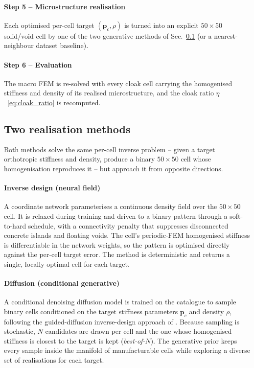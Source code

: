 \documentclass[preprint,12pt]{elsarticle}
\newcommand{\mbf}[1]{\mathbf{#1}}
\begin{document}
\paragraph{Step 5 -- Microstructure realisation} Each optimised per-cell target $(\mbf{p}_c,\rho)$ is turned into an explicit $50\times50$ solid/void cell by one of the two generative methods of Sec.~\ref{subsec:micro_methods} (or a nearest-neighbour dataset baseline).

\paragraph{Step 6 -- Evaluation} The macro FEM is re-solved with every cloak
cell carrying the homogenised stiffness and density of its realised microstructure, and the
cloak ratio $\eta$~\eqref{eq:cloak_ratio} is recomputed.

\subsection{Two realisation methods}\label{subsec:micro_methods}

Both methods solve the same per-cell inverse problem -- given a target
orthotropic stiffness and density, produce a binary $50\times50$ cell whose
homogenisation reproduces it -- but approach it from opposite directions.

\paragraph{Inverse design (neural field)} A coordinate network parameterises a
continuous density field over the $50\times50$ cell. It is relaxed during
training and driven to a binary pattern through a soft-to-hard schedule, with a
connectivity penalty that suppresses disconnected concrete islands and floating
voids. The cell's periodic-FEM homogenised stiffness is differentiable in the
network weights, so the pattern is optimised directly against the per-cell target
error. The method is deterministic and returns a single, locally optimal cell for
each target.

\paragraph{Diffusion (conditional generative)} A conditional denoising diffusion
model is trained on the catalogue to sample binary cells conditioned on
the target stiffness parameters $\mbf{p}_c$ and density $\rho$, following the guided-diffusion inverse-design approach of \citet{yang2024}. Because sampling is stochastic, $N$ candidates are drawn per cell and the one whose homogenised stiffness is closest to the target is kept (\emph{best-of-$N$}). The generative prior keeps every sample
inside the manifold of manufacturable cells while exploring a diverse set of
realisations for each target.
\end{document}
